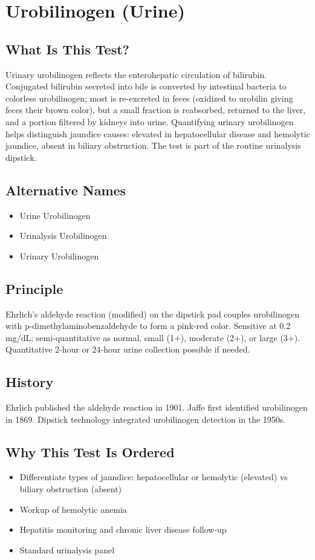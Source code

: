 \chapter{Urobilinogen (Urine)}

\section*{What Is This Test?}
Urinary urobilinogen reflects the enterohepatic circulation of bilirubin. Conjugated bilirubin secreted into bile is converted by intestinal bacteria to colorless urobilinogen; most is re-excreted in feces (oxidized to urobilin giving feces their brown color), but a small fraction is reabsorbed, returned to the liver, and a portion filtered by kidneys into urine. Quantifying urinary urobilinogen helps distinguish jaundice causes: elevated in hepatocellular disease and hemolytic jaundice, absent in biliary obstruction. The test is part of the routine urinalysis dipstick.

\section*{Alternative Names}
\begin{itemize}
  \item Urine Urobilinogen
  \item Urinalysis Urobilinogen
  \item Urinary Urobilinogen
\end{itemize}
\section*{Principle}
Ehrlich's aldehyde reaction (modified) on the dipstick pad couples urobilinogen with p-dimethylaminobenzaldehyde to form a pink-red color. Sensitive at 0.2 mg/dL; semi-quantitative as normal, small (1+), moderate (2+), or large (3+). Quantitative 2-hour or 24-hour urine collection possible if needed.

\section*{History}
Ehrlich published the aldehyde reaction in 1901. Jaffe first identified urobilinogen in 1869. Dipstick technology integrated urobilinogen detection in the 1950s.

\section*{Why This Test Is Ordered}
\begin{itemize}
  \item Differentiate types of jaundice: hepatocellular or hemolytic (elevated) vs biliary obstruction (absent)
  \item Workup of hemolytic anemia
  \item Hepatitis monitoring and chronic liver disease follow-up
  \item Standard urinalysis panel
\end{itemize}

